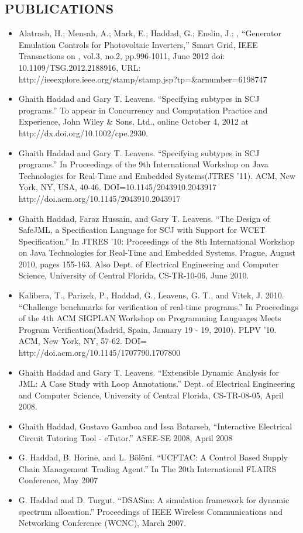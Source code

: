 \documentclass[line,margin]{res}
\begin{document}
\begin{resume}
\section{PUBLICATIONS}
\begin{itemize} \itemsep -2pt
     \item Alatrash, H.; Mensah, A.; Mark, E.; Haddad, G.; Enslin, J.; ,
     ``Generator Emulation Controls for Photovoltaic Inverters,'' Smart Grid,
     IEEE Transactions on , vol.3, no.2, pp.996-1011, June 2012 doi:
     10.1109/TSG.2012.2188916, URL:
     http://ieeexplore.ieee.org/stamp/stamp.jsp?tp=\&arnumber=6198747
     \item Ghaith Haddad and Gary T. Leavens. ``Specifying subtypes in SCJ
     programs.'' To appear in Concurrency and Computation Practice and Experience,
     John Wiley \& Sons, Ltd., online October 4, 2012 at
     http://dx.doi.org/10.1002/cpe.2930.
     \item Ghaith Haddad and Gary T. Leavens. ``Specifying subtypes in SCJ
     programs.'' In Proceedings of the 9th International Workshop on Java
     Technologies for Real-Time and Embedded Systems(JTRES '11). ACM, New York,
     NY, USA, 40-46. DOI=10.1145/2043910.2043917
     http://doi.acm.org/10.1145/2043910.2043917
     \item Ghaith Haddad, Faraz Hussain, and Gary T. Leavens. ``The Design of
     SafeJML, a Specification Language for SCJ with Support for WCET
     Specification.'' In JTRES '10: Proceedings of the 8th International Workshop
     on Java Technologies for Real-Time and Embedded Systems, Prague, August
     2010, pages 155-163.
     Also Dept. of Electrical Engineering and Computer Science, University of
     Central Florida, CS-TR-10-06, June 2010.
     \item Kalibera, T., Parizek, P., Haddad, G., Leavens, G. T., and Vitek, J.
     2010. ``Challenge benchmarks for verification of real-time programs.'' In
     Proceedings of the 4th ACM SIGPLAN Workshop on Programming Languages Meets
     Program Verification(Madrid, Spain, January 19 - 19, 2010). PLPV '10. ACM,
     New York, NY, 57-62. DOI= http://doi.acm.org/10.1145/1707790.1707800
     \item Ghaith Haddad and Gary T. Leavens. ``Extensible Dynamic Analysis for
     JML: A Case Study with Loop Annotations.'' Dept. of Electrical Engineering
     and Computer Science, University of Central Florida, CS-TR-08-05, April
     2008.
     \item Ghaith Haddad, Gustavo Gamboa and Issa Batarseh, ``Interactive
     Electrical Circuit Tutoring Tool - eTutor.'' ASEE-SE 2008, April 2008
     \item G. Haddad, B. Horine, and L. B\"{o}l\"{o}ni. ``UCFTAC: A
     Control Based Supply Chain Management Trading Agent.'' In The 20th
     International FLAIRS Conference, May 2007
     \item G. Haddad and D. Turgut. ``DSASim: A simulation
     framework for dynamic spectrum allocation.'' Proceedings of IEEE Wireless
     Communications and Networking Conference (WCNC), March 2007.
\end{itemize} 


\end{resume}
\end{document}
